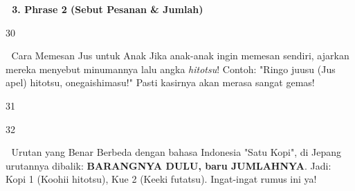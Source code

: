 \vspace{1em}
\begin{tcolorbox}[colback=boxframe, colframe=boxframe, rounded corners, boxrule=0pt, arc=3mm, left=2mm, top=2mm, bottom=2mm]
    \Large \bfseries \color{white} 🍩 3. Phrase 2 (Sebut Pesanan \& Jumlah)
\end{tcolorbox}
\vspace{1em}

\begin{convobox}{30}
    \noindent
      

    \vspace{1.5em}
\end{convobox}

\begin{lessonbox}{🥤 Cara Memesan Jus untuk Anak}
    Jika anak-anak ingin memesan sendiri, ajarkan mereka menyebut minumannya lalu angka \textit{hitotsu}! Contoh:
    "Ringo juusu (Jus apel) hitotsu, onegaishimasu!" Pasti kasirnya akan merasa sangat gemas!
\end{lessonbox}

\begin{convobox}{31}
    \noindent
      
      
      

    \vspace{1.5em}
\end{convobox}

\begin{convobox}{32}
    \noindent
      

    \vspace{1.5em}
\end{convobox}

\begin{lessonbox}{📝 Urutan yang Benar}
    Berbeda dengan bahasa Indonesia "Satu Kopi", di Jepang urutannya dibalik: \textbf{BARANGNYA DULU, baru JUMLAHNYA}. Jadi: Kopi 1 (Koohii hitotsu), Kue 2 (Keeki futatsu). Ingat-ingat rumus ini ya!
\end{lessonbox}

